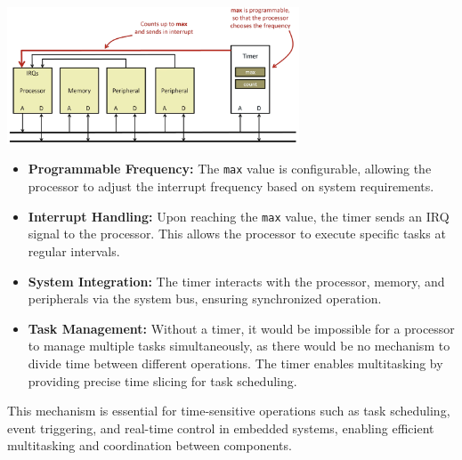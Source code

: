\begin{center}
    \includegraphics[width=0.65\textwidth]{chapters/chapter2c/images/timer.png}
\end{center}
\begin{itemize}
    \item \textbf{Programmable Frequency:} The \texttt{max} value is configurable, allowing the processor to adjust the interrupt frequency based on system requirements.
    \item \textbf{Interrupt Handling:} Upon reaching the \texttt{max} value, the timer sends an IRQ signal to the processor. This allows the processor to execute specific tasks at regular intervals.
    \item \textbf{System Integration:} The timer interacts with the processor, memory, and peripherals via the system bus, ensuring synchronized operation.
    \item \textbf{Task Management:} Without a timer, it would be impossible for a processor to manage multiple tasks simultaneously, as there would be no mechanism to divide time between different operations. The timer enables multitasking by providing precise time slicing for task scheduling.
\end{itemize}

This mechanism is essential for time-sensitive operations such as task scheduling, event triggering, and real-time control in embedded systems, enabling efficient multitasking and coordination between components.


